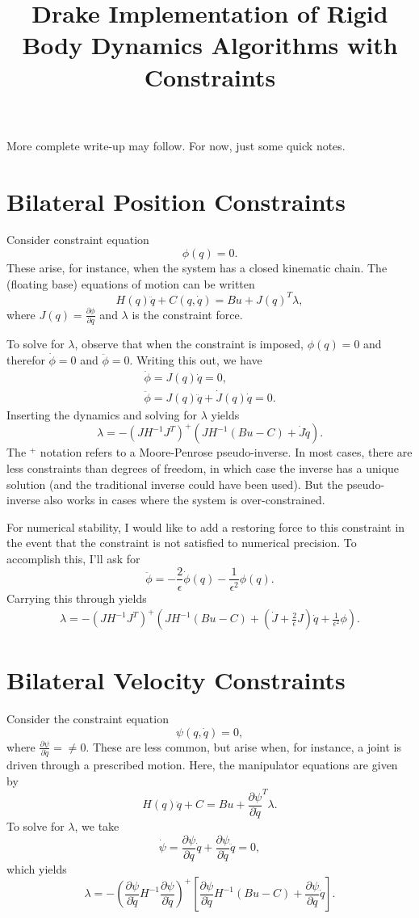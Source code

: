 \documentclass{article}
\title{Drake Implementation of Rigid Body Dynamics Algorithms with Constraints}
\newcommand{\pd}[2]{\frac{\partial #1}{\partial #2}}
\begin{document}
\maketitle

More complete write-up may follow.  For now, just some quick notes.


\section{Bilateral Position Constraints}

Consider constraint equation $$\phi(q) = 0.$$  These arise, for
instance, when the system has a closed kinematic chain.  
The (floating base) equations of motion can be written 
$$H(q)\ddot{q} + C(q,\dot{q}) = B u + J(q)^T \lambda,$$
where $J(q) = \pd{\phi}{q}$ and $\lambda$ is the constraint force.

To solve for $\lambda$, observe that when the constraint is imposed, 
$\phi(q)=0$ and therefor $\dot{\phi}=0$ and $\ddot{\phi}=0$.  Writing
this out, we have \begin{gather*}\dot{\phi} = J(q)\dot{q}=0,\\
  \ddot{\phi} = J(q) \ddot{q} + \dot{J}(q) \dot{q} = 0.\end{gather*}
Inserting the dynamics and solving for $\lambda$ yields $$\lambda =- (J
H^{-1} J^T)^+ (J H^{-1} (Bu - C) + \dot{J}\dot{q}).$$ The
$^+$ notation refers to a Moore-Penrose pseudo-inverse.  In most cases, there
are less constraints than degrees of freedom, in which case the
inverse has a unique solution (and the traditional inverse could have
been used).  But the pseudo-inverse also works in cases where the
system is over-constrained. 

For numerical stability, I would like to add a restoring force to
this constraint in the event that the constraint is not satisfied to
numerical precision.  To accomplish this, I'll ask for $$\ddot\phi =
-\frac{2}{\epsilon} \dot\phi(q) - \frac{1}{\epsilon^2} \phi(q).$$
Carrying this through
yields 
\begin{gather*}
\lambda =- (J
H^{-1} J^T)^+ (J H^{-1} (Bu - C) + (\dot{J} + \frac{2}{\epsilon}
J)\dot{q} + \frac{1}{\epsilon^2} \phi).
\end{gather*}


\section{Bilateral Velocity Constraints}

Consider the constraint equation 
$$\psi(q,\dot{q}) = 0,$$
where $\pd{\psi}{\dot{q}} =\ne 0.$  These are less common, but arise
when, for instance, a joint is driven through a prescribed motion.  
Here, the manipulator equations are given by $$H(q)\ddot{q} + C = B u
+ \pd{\psi}{\dot{q}}^T \lambda.$$
To solve for $\lambda$, we take $$\dot{\psi} = \pd{\psi}{q} \dot{q} +
\pd{\psi}{\dot{q}}\ddot{q} = 0,$$ which yields
$$\lambda = - \left( \pd{\psi}{\dot{q}} H^{-1} \pd{\psi}{\dot{q}}
  \right)^+ \left[ \pd{\psi}{\dot{q}} H^{-1} (Bu - C) + \pd{\psi}{q}
    \dot{q} \right].$$
 
\end{document}
